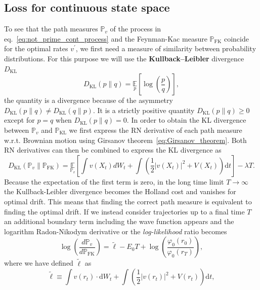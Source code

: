 \subsection{Loss for continuous state space}
\label{subsec:continuous_loss}
To see that the path measures $\mathbb{P}_v$ of the process in eq.~\eqref{eq:not_prime_cont_process}  and the Feynman-Kac measure $\mathbb{P}_{\mathrm{FK}}$ coincide for the optimal rates $v^\prime$, we first need a measure of similarity between probability distributions. For this purpose we will use the \textbf{Kullback–Leibler} divergence $D_{\mathrm{KL}}$
\begin{equation}
	D_{\mathrm{KL}}(p \| q)=\underset{p}{\mathbb{E}}\left[\log \left(\frac{p}{q}\right)\right],
\end{equation}
the quantity is a divergence because of the asymmetry $D_{\mathrm{KL}}(p \| q) \neq D_{\mathrm{KL}}(q \| p)$. It is a strictly positive quantity $D_{\mathrm{KL}}(p \| q) \geq 0$ except for $p = q$ when $D_{\mathrm{KL}}(p \| q) = 0$. In order to obtain the KL divergence between $\mathbb{P}_v$ and $\mathbb{P}_{\mathrm{KL}}$ we first express the RN derivative of each path measure w.r.t. Brownian motion using Girsanov theorem~\eqref{eq:Girsanov_theorem}. Both RN derivatives can then be combined to express the KL divergence as 
\begin{equation}
\label{eq:dkl-cont_no_lim}
D_{\mathrm{KL}}\left(\mathbb{P}_{v} \| \mathbb{P}_{\mathrm{FK}}\right) 
=
\underset{\mathbb{P}_{v}}{\mathbb{E}}\left[
\int v\left(X_{t}\right) d W_{t} + \int \left(\frac{1}{2}\left|v\left(X_{t}\right)\right|^{2}+V\left(X_{t}\right)\right)\mathrm{d}t \right]-\lambda T.
\end{equation}
Because the expectation of the first term is zero, in the long time limit $T \rightarrow \infty$ the Kullback-Leibler divergence becomes the Holland cost and vanishes for optimal drift. This means that finding the correct path measure is equivalent to finding the optimal drift. If we instead consider trajectories up to a final time $T$ an additional boundary term including the wave function appears and the logarithm Radon-Nikodym derivative or the \emph{log-likelihood} ratio becomes
\begin{equation}
	\log \left(\frac{d \mathbb{P}_{v}}{d \mathbb{P}_{\mathrm{FK}}}\right)=
	\tilde{\ell}-
	E_{0} T+
	\log 
	\left(
	\frac{\varphi_{0}\left(r_{0}\right)}{\varphi_{0}\left(r_{T}\right)}
	\right),
\end{equation}
where we have defined $\tilde{\ell}$ as
\begin{equation}
	\tilde{\ell} \equiv \int v\left(r_{t}\right) \cdot \mathrm{d} W_{t}+\int \left(\frac{1}{2}\left|v\left(r_{t}\right)\right|^{2}+V\left(r_{t}\right)\right)\mathrm{d} t,
\end{equation}
